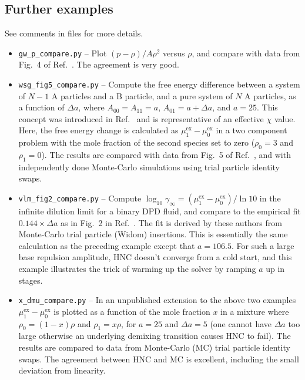 \documentclass[12pt,a4paper]{article}
\newcommand{\myex}{^{\mathrm{ex}}}
\newcommand{\muex}{\mu\myex}
\newcommand{\Refcite}[1]{Ref.~\cite{#1}}
\begin{document}

\subsection{Further examples}

See comments in files for more details.

\begin{itemize}
%
\item\verb+gw_p_compare.py+ -- Plot $(p-\rho) /A\rho^2$ versus $\rho$,
  and compare with data from Fig.~4 of \Refcite{GW97}.  The agreement
  is very good.
%
\item\verb+wsg_fig5_compare.py+ -- Compute the free energy difference
  between a system of $N-1$ A particles and a B particle, and a pure
  system of $N$ A particles, as a function of $\Delta a$, where
  $A_{00}=A_{11}=a$, $A_{01}=a+\Delta a$, and $a=25$.  This concept
  was introduced in \Refcite{WSG01} and is representative of an
  effective $\chi$ value.  Here, the free energy change is calculated
  as $\muex_1-\muex_0$ in a two component problem with the mole
  fraction of the second species set to zero ($\rho_0=3$ and
  $\rho_1=0$).  The results are compared with data from Fig.~5 of
  \Refcite{WSG01}, and with independently done Monte-Carlo simulations
  using trial particle identity swaps.
%
\item\verb+vlm_fig2_compare.py+ -- Compute $\log_{10}\gamma_\infty =
  (\muex_1 - \muex_0) / \ln 10$ in the infinite dilution limit for a
  binary DPD fluid, and compare to the empirical fit $0.144 \times
  \Delta a$ as in Fig.~2 in \Refcite{VLN13}.  The fit is derived by
  these authors from Monte-Carlo trial particle (Widom) insertions.
  This is essentially the same calculation as the preceding example
  except that $a=106.5$.  For such a large base repulsion amplitude,
  HNC doesn't converge from a cold start, and this example illustrates
  the trick of warming up the solver by ramping $a$ up in stages.
%
\item\verb+x_dmu_compare.py+ -- In an unpublished extension to the
  above two examples $\muex_1-\muex_0$ is plotted as a function of the
  mole fraction $x$ in a mixture where $\rho_0=(1-x)\rho$ and
  $\rho_1=x\rho$, for $a=25$ and $\Delta a=5$ (one cannot have $\Delta
  a$ too large otherwise an underlying demixing transition causes HNC
  to fail).  The results are compared to data from Monte-Carlo (MC)
  trial particle identity swaps.  The agreement between HNC
  and MC is excellent, including the small deviation from linearity.

\end{itemize}
\end{document}
